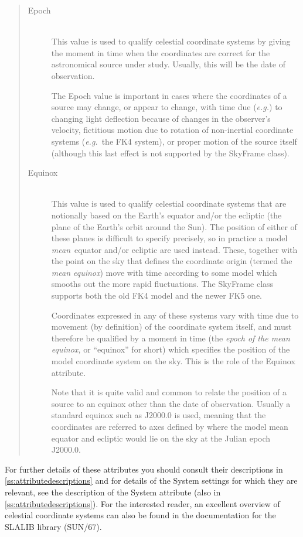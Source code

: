 \documentclass[twoside,11pt]{article}
\newcommand{\xref}[3]{#1}
\newcommand{\appref}[1]{Appendix~\ref{#1}}
\renewcommand{\appref}[1]{\ref{#1}}
\begin{document}
\begin{quote}
\begin{description}
\item[Epoch]\mbox{}\\
This value is used to qualify celestial coordinate systems by giving
the moment in time when the coordinates are correct for the
astronomical source under study. Usually, this will be the date of
observation.

The Epoch value is important in cases where the coordinates of a
source may change, or appear to change, with time due ({\em{e.g.}}) to
changing light deflection because of changes in the observer's
velocity, fictitious motion due to rotation of non-inertial coordinate
systems ({\em{e.g.}}\ the FK4 system), or proper motion of the source
itself (although this last effect is not supported by the SkyFrame
class).

\item[\label{ss:equinoxitem}Equinox]\mbox{}\\
This value is used to qualify celestial coordinate systems that are
notionally based on the Earth's equator and/or the ecliptic (the plane
of the Earth's orbit around the Sun). The position of either of these
planes is difficult to specify precisely, so in practice a model
{\em{mean}}\ equator and/or ecliptic are used instead. These, together
with the point on the sky that defines the coordinate origin (termed
the {\em{mean equinox}}) move with time according to some model which
smooths out the more rapid fluctuations. The SkyFrame class supports
both the old FK4 model and the newer FK5 one.

Coordinates expressed in any of these systems vary with time due to
movement (by definition) of the coordinate system itself, and must
therefore be qualified by a moment in time (the {\em{epoch of the mean
equinox,}} or ``equinox'' for short) which specifies the position of
the model coordinate system on the sky. This is the role of the
Equinox attribute.

Note that it is quite valid and common to relate the position of a
source to an equinox other than the date of observation. Usually a
standard equinox such as J2000.0 is used, meaning that the coordinates
are referred to axes defined by where the model mean equator and
ecliptic would lie on the sky at the Julian epoch J2000.0.
\end{description}
\end{quote}

For further details of these attributes you should consult their
descriptions in \appref{ss:attributedescriptions} and for details of
the System settings for which they are relevant, see the description
of the System attribute (also in \appref{ss:attributedescriptions}).
For the interested reader, an excellent overview of celestial
coordinate systems can also be found in the documentation for the
SLALIB library (\xref{SUN/67}{sun67}{}).
\end{document}
